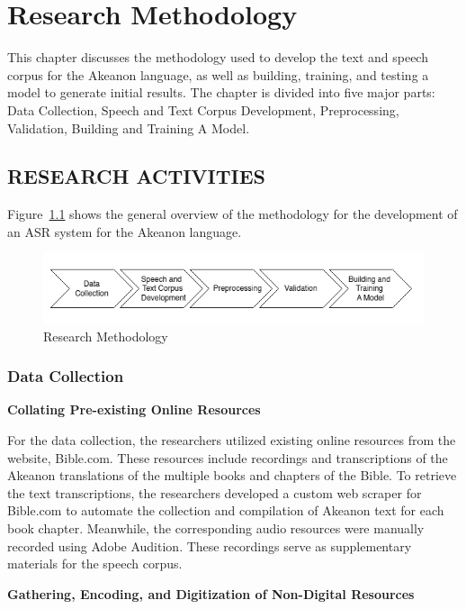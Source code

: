 \chapter{Research Methodology}
This chapter discusses the methodology used to develop the text and speech corpus for the Akeanon language, as well as building, training, and testing a model to generate initial results. The chapter is divided into five major parts: Data Collection, Speech and Text Corpus Development, Preprocessing, Validation, Building and Training A Model.

\section{RESEARCH ACTIVITIES}
Figure~\ref{fig:flowchart} shows the general overview of the methodology for the development of an ASR system for the Akeanon language.

\begin{figure}[h!]
	\centering
	\includegraphics[width=\textwidth]{./figures/flowchart.png}
   \caption{Research Methodology}
	\label{fig:flowchart}
\end{figure}


\subsection{Data Collection}

\textbf{Collating Pre-existing Online Resources}

For the data collection, the researchers utilized existing online resources from the website, Bible.com. These resources include recordings and transcriptions of the Akeanon translations of the multiple books and chapters of the Bible. To retrieve the text transcriptions, the researchers developed a custom web scraper for Bible.com to automate the collection and compilation of Akeanon text for each book chapter. Meanwhile, the corresponding audio resources were manually recorded using Adobe Audition. These recordings serve as supplementary materials for the speech corpus.

\textbf{Gathering, Encoding, and Digitization of Non-Digital Resources}

